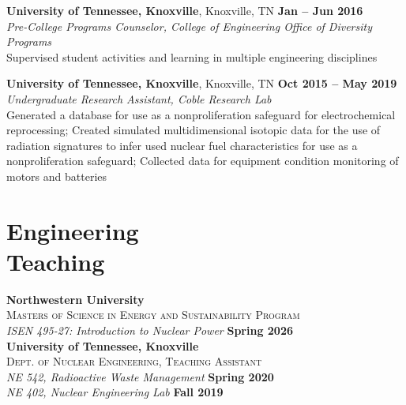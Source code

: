 \documentclass[margin,line]{resume}
\begin{document}
\begin{resume}
    \textbf{University of Tennessee, Knoxville}, Knoxville, TN \hfill \textbf{Jan -- Jun 2016}\vspace{1mm}\\
                \textsl{Pre-College Programs Counselor, College of Engineering Office of Diversity Programs}\\
                Supervised student activities and learning in multiple engineering disciplines

    \textbf{University of Tennessee, Knoxville}, Knoxville, TN \hfill \textbf{Oct 2015 -- May 2019}\vspace{1mm}\\
                \textsl{Undergraduate Research Assistant, Coble Research Lab}\\
                Generated a database for use as a nonproliferation safeguard for electrochemical reprocessing;
                Created simulated multidimensional isotopic data for the use of radiation signatures to infer 
                used nuclear fuel characteristics for use as a nonproliferation safeguard;
                Collected data for equipment condition monitoring of motors and batteries

    \section{\mysidestyle Engineering\\Teaching}
    \textbf{Northwestern University}\\
    \textsc{Masters of Science in Energy and Sustainability Program}\\
               \textsl{ISEN 495-27: Introduction to Nuclear Power} \hfill \textbf{Spring 2026} \vspace{-5mm}\\

    \textbf{University of Tennessee, Knoxville}\\
    \textsc{Dept. of Nuclear Engineering, Teaching Assistant}\\
               \textsl{NE 542, Radioactive Waste Management} \hfill \textbf{Spring 2020}\\
               \textsl{NE 402, Nuclear Engineering Lab} \hfill \textbf{Fall 2019}
               \vspace{2mm}


\end{resume}
\end{document}
